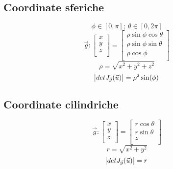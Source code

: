 \documentclass[a4paper,portrait,columns=3,5pt]{cheatsheet}
\begin{document}
\subsection{Coordinate sferiche}
$$ \phi \in [0, \pi]; ~ \theta \in [0, 2\pi]$$
\begin{equation*}
	\vec{g} :
	\begin{bmatrix}
		x \\
		y \\
		z \\
	\end{bmatrix} =
	\begin{bmatrix}
		\rho \sin \phi \cos \theta \\
		\rho \sin \phi \sin \theta \\
		\rho \cos \phi             \\
	\end{bmatrix}
\end{equation*}
\begin{equation*}
	\rho = \sqrt{x^2 + y^2 + z^2}
\end{equation*}
\begin{equation*}
	\abs{detJ_{\vec{g}}(\vec{u})} = \rho^2 \sin(\phi)
\end{equation*}
\subsection{Coordinate cilindriche}
\begin{equation*}
	\vec{g} :
	\begin{bmatrix}
		x \\
		y \\
		z \\
	\end{bmatrix} =
	\begin{bmatrix}
		r \cos \theta \\
		r \sin \theta \\
		z             \\
	\end{bmatrix}
\end{equation*}
\begin{equation*}
	r = \sqrt{x^2 + y^2}
\end{equation*}
\begin{equation*}
	\abs{detJ_{\vec{g}}(\vec{u})} = r
\end{equation*}
\end{document}
